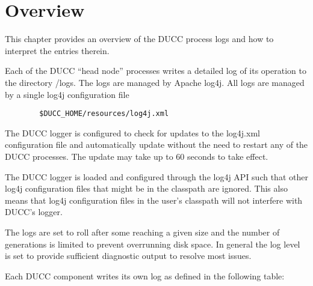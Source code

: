 % 
% 
% 
% 
 \section{Overview}

    This chapter provides an overview of the DUCC process logs and how to interpret the
    entries therein.

    Each of the DUCC ``head node'' processes writes a detailed log of its operation to
    the directory \ducchome/logs.  The logs are managed by Apache log4j.  All logs are
    managed by a single log4j configuration file
\begin{verbatim}
        $DUCC_HOME/resources/log4j.xml
\end{verbatim}

    The DUCC logger is configured to check for updates to the log4j.xml
    configuration file and automatically update without the need to restart any of
    the DUCC processes.  The update may take up to 60 seconds to take effect.

    The DUCC logger is loaded and configured through the log4j API such that other
    log4j configuration files that might be in the classpath are ignored.  This also
    means that log4j configuration files in the user's classpath will not interfere
    with DUCC's logger.

    The logs are set to roll after some reaching a given size and the number of generations
    is limited to prevent overrunning disk space.  In general the log level is set to
    provide sufficient diagnostic output to resolve most issues.

    Each DUCC component writes its own log as defined in the following table:

